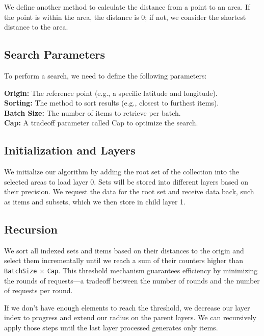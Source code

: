 \documentclass[11pt]{article}
\begin{document}
\vspace{1em}

\noindent We define another method to calculate the distance from a point to an area. If the point is within the area, the distance is 0; if not, we consider the shortest distance to the area.

\subsection*{Search Parameters}

To perform a search, we need to define the following parameters:

\begin{tcolorbox}[colframe=black!75!black]
    \textbf{Origin:} The reference point (e.g., a specific latitude and longitude).\\
    \textbf{Sorting:} The method to sort results (e.g., closest to furthest items).\\
    \textbf{Batch Size:} The number of items to retrieve per batch.\\
    \textbf{Cap:} A tradeoff parameter called Cap to optimize the search.
\end{tcolorbox}

\subsection*{Initialization and Layers}

We initialize our algorithm by adding the root set of the collection into the selected areas to load layer 0. Sets will be stored into different layers based on their precision. We request the data for the root set and receive data back, such as items and subsets, which we then store in child layer 1.

\subsection*{Recursion}

We sort all indexed sets and items based on their distances to the origin and select them incrementally until we reach a sum of their counters higher than \texttt{BatchSize} \(\times\) \texttt{Cap}. This threshold mechanism guarantees efficiency by minimizing the rounds of requests—a tradeoff between the number of rounds and the number of requests per round.

If we don't have enough elements to reach the threshold, we decrease our layer index to progress and extend our radius on the parent layers. We can recursively apply those steps until the last layer processed generates only items. 
\end{document}
